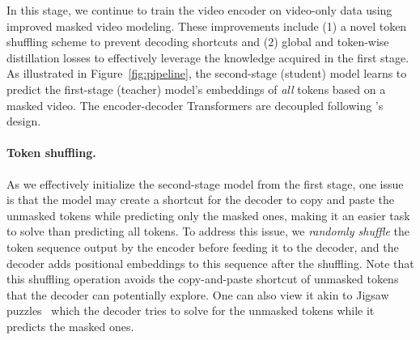 \documentclass{article}
\theoremstyle{plain}
\theoremstyle{definition}
\theoremstyle{remark}
\newcommand{\myparagraph}[1]{\paragraph{#1}}
\begin{document}
In this stage, we continue to train the video encoder on video-only data using improved masked video modeling. These improvements include (1) a novel token shuffling scheme to prevent decoding shortcuts and (2) global and token-wise distillation losses to effectively leverage the knowledge acquired in the first stage. 
As illustrated in Figure~\ref{fig:pipeline}, the second-stage (student) model learns to predict the first-stage (teacher) model's embeddings of \emph{all} tokens based on a masked video.
The encoder-decoder Transformers are decoupled following \citet{he2022masked}'s design.









\myparagraph{Token shuffling.} As we effectively initialize the second-stage model from the first stage, one issue is that the model may create a shortcut for the decoder to copy and paste the unmasked tokens while predicting only the masked ones, making it an easier task to solve than predicting all tokens. To address this issue, we \emph{randomly shuffle} the token sequence output by the encoder before feeding it to the decoder, and the decoder adds positional embeddings to this sequence after the shuffling. Note that this shuffling operation avoids the copy-and-paste shortcut of unmasked tokens that the decoder can potentially explore. One can also view it akin to Jigsaw puzzles~\cite{noroozi2016unsupervised} which the decoder tries to solve for the unmasked tokens while it predicts the masked ones. 
\end{document}
